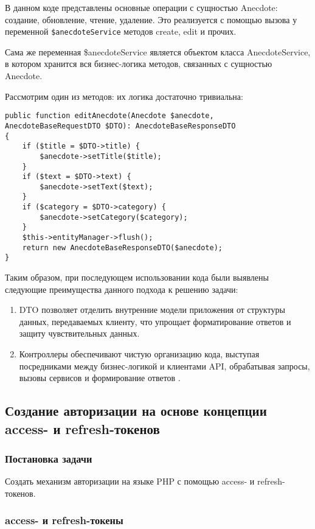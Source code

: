 \documentclass[pract]{SCWorks}
\begin{document}
В данном коде представлены основные операции с сущностью Anecdote: создание,
обновление, чтение, удаление. Это реализуется с помощью вызова у переменной
\texttt{\$anecdoteService} методов create, edit и прочих.

Сама же переменная \$anecdoteService является объектом класса
AnecdoteService, в котором хранится вся бизнес-логика методов, связанных с 
сущностью Anecdote. 

Рассмотрим один из методов: их логика достаточно тривиальна:

\begin{verbatim}
public function editAnecdote(Anecdote $anecdote, AnecdoteBaseRequestDTO $DTO): AnecdoteBaseResponseDTO
{
    if ($title = $DTO->title) {
        $anecdote->setTitle($title);
    }
    if ($text = $DTO->text) {
        $anecdote->setText($text);
    }
    if ($category = $DTO->category) {
        $anecdote->setCategory($category);
    }
    $this->entityManager->flush();
    return new AnecdoteBaseResponseDTO($anecdote);
}
\end{verbatim}

Таким образом, при последующем использовании кода были выявлены следующие
преимущества данного подхода к решению задачи: 

\begin{enumerate}
    \item DTO позволяет отделить внутренние модели приложения от структуры 
    данных, передаваемых клиенту, что упрощает форматирование ответов и 
    защиту чувствительных данных.
    \item Контроллеры обеспечивают чистую организацию кода, выступая 
    посредниками между бизнес-логикой и клиентами API, обрабатывая запросы, 
    вызовы сервисов и формирование ответов \cite{rest_api_tutorial}
    \cite{microsoft_rest_api} \cite{aws_rest_api}.
\end{enumerate}

\subsection{Создание авторизации на основе концепции access- и refresh-токенов}
\subsubsection{Постановка задачи}
Создать механизм авторизации на языке PHP с помощью access- и refresh-токенов.

\subsubsection{access- и refresh-токены}
\end{document}
